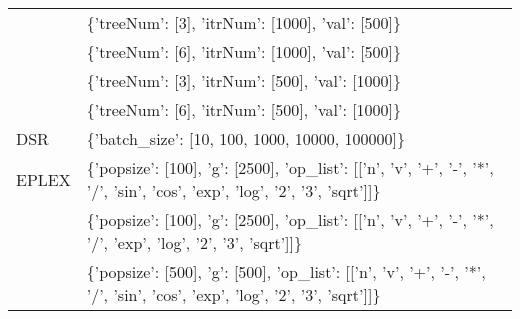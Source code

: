 \begin{tabular}{l p{37em}}
              &                                                                                                                                                                                                                                                                 \{'treeNum': [3], 'itrNum': [1000], 'val': [500]\} \\
              &                                                                                                                                                                                                                                                                 \{'treeNum': [6], 'itrNum': [1000], 'val': [500]\} \\
              &                                                                                                                                                                                                                                                                 \{'treeNum': [3], 'itrNum': [500], 'val': [1000]\} \\
              &                                                                                                                                                                                                                                                                 \{'treeNum': [6], 'itrNum': [500], 'val': [1000]\} \\
          DSR &                                                                                                                                                                                                                                                                   \{'batch\_size': [10, 100, 1000, 10000, 100000]\} \\
        EPLEX &                                                                                                                                                                                       \{'popsize': [100], 'g': [2500], 'op\_list': [['n', 'v', '+', '-', '*', '/', 'sin', 'cos', 'exp', 'log', '2', '3', 'sqrt']]\} \\
              &                                                                                                                                                                                                     \{'popsize': [100], 'g': [2500], 'op\_list': [['n', 'v', '+', '-', '*', '/', 'exp', 'log', '2', '3', 'sqrt']]\} \\
              &                                                                                                                                                                                        \{'popsize': [500], 'g': [500], 'op\_list': [['n', 'v', '+', '-', '*', '/', 'sin', 'cos', 'exp', 'log', '2', '3', 'sqrt']]\} \\

\end{tabular}
